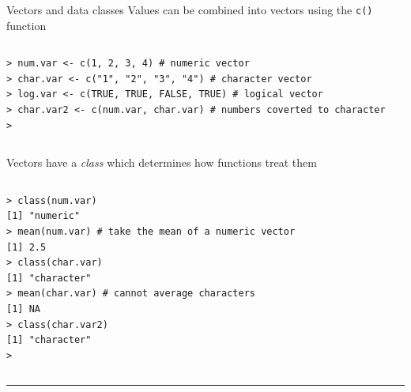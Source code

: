\documentclass[table,smaller]{beamer}
\begin{document}
\begin{frame}[fragile,label=sec-2-1]{Vectors and data classes}
 Values can be combined into vectors using the \verb~c()~ function
\vspace{-.5em}
\begin{columns}
\begin{block}{}
\begin{verbatim}
> num.var <- c(1, 2, 3, 4) # numeric vector
> char.var <- c("1", "2", "3", "4") # character vector
> log.var <- c(TRUE, TRUE, FALSE, TRUE) # logical vector
> char.var2 <- c(num.var, char.var) # numbers coverted to character
>
\end{verbatim}
\end{block}
\end{columns}
\vspace{.5em}

Vectors have a \emph{class} which determines how functions treat them
\vspace{-.5em}
\begin{columns}
\begin{block}{}
\begin{verbatim}
> class(num.var)
[1] "numeric"
> mean(num.var) # take the mean of a numeric vector
[1] 2.5
> class(char.var)
[1] "character"
> mean(char.var) # cannot average characters
[1] NA
> class(char.var2)
[1] "character"
>
\end{verbatim}
\end{block}
\end{columns}
\vspace{.5em}

\rule{\linewidth}{0.5pt}
\end{frame}
\end{document}

